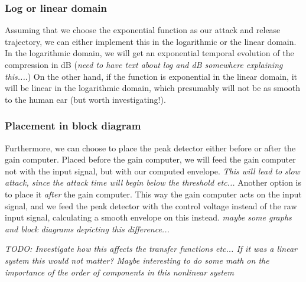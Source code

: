 \documentclass[]{article}
\begin{document}
\subsubsection{Log or linear domain}
Assuming that we choose the exponential function as our attack and release trajectory, we can either implement this in the logarithmic or the linear domain. In the logarithmic domain, we will get an exponential temporal evolution of the compression in dB (\emph{need to have text about log and dB somewhere explaining this...}.) On the other hand, if the function is exponential in the linear domain, it will be linear in the logarithmic domain, which presumably will not be as smooth to the human ear (but worth investigating!).

\subsubsection{Placement in block diagram}
Furthermore, we can choose to place the peak detector either before or after the gain computer. Placed before the gain computer, we will feed the gain computer not with the input signal, but with our computed envelope. \emph{This will lead to slow attack, since the attack time will begin below the threshold etc...}
Another option is to place it \emph{after} the gain computer. This way the gain computer acts on the input signal, and we feed the peak detector with the control voltage instead of the raw input signal, calculating a smooth envelope on this instead. \emph{maybe some graphs and block diagrams depicting this difference...}

\emph{TODO: Investigate how this affects the transfer functions etc... If it was a linear system this would not matter? Maybe interesting to do some math on the importance of the order of components in this nonlinear system}



\end{document}
